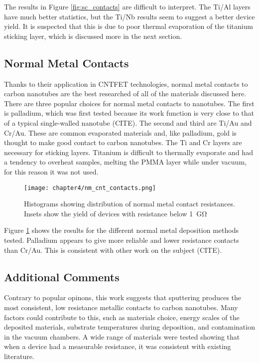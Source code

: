 The results in Figure \ref{fig:sc_contacts} are difficult to interpret. The Ti/Al layers have much better statistics, but the Ti/Nb results seem to suggest a better device yield. It is suspected that this is due to poor thermal evaporation of the titanium sticking layer, which is discussed more in the next section.

\subsection{Normal Metal Contacts}

Thanks to their application in CNTFET technologies, normal metal contacts to carbon nanotubes are the best researched of all of the materials discussed here. There are three popular choices for normal metal contacts to nanotubes. The first is palladium, which was first tested because its work function is very close to that of a typical single-walled  nanotube (CITE). The second and third are Ti/Au and Cr/Au. These are common evaporated materials and, like palladium, gold is thought to make good contact to carbon nanotubes. The Ti and Cr layers are necessary for sticking layers. Titanium is difficult to thermally evaporate and had a tendency to overheat samples, melting the PMMA layer while under vacuum, for this reason it was not used. 

\begin{figure}
    \centering
    \texttt{[image: chapter4/nm\_cnt\_contacts.png]}
    \caption{Histograms showing distribution of normal metal contact resistances. Insets show the yield of devices with resistance below \SI{1}{\giga\ohm}}
    \label{fig:nm_contacts}
\end{figure}

Figure \ref{fig:nm_contacts} shows the results for the different normal metal deposition methods tested. Palladium appears to give more reliable and lower resistance contacts than Cr/Au. This is consistent with other work on the subject (CITE).

\subsection{Additional Comments}

Contrary to popular opinons, this work suggests that sputtering produces the most consistent, low resistance metallic contacts to carbon nanotubes. Many factors could contribute to this, such as materials choice, energy scales of the deposited materials, substrate temperatures during deposition, and contamination in the vacuum chambers. A wide range of materials were tested showing that when a device had a measurable resistance, it was consistent with existing literature. 

